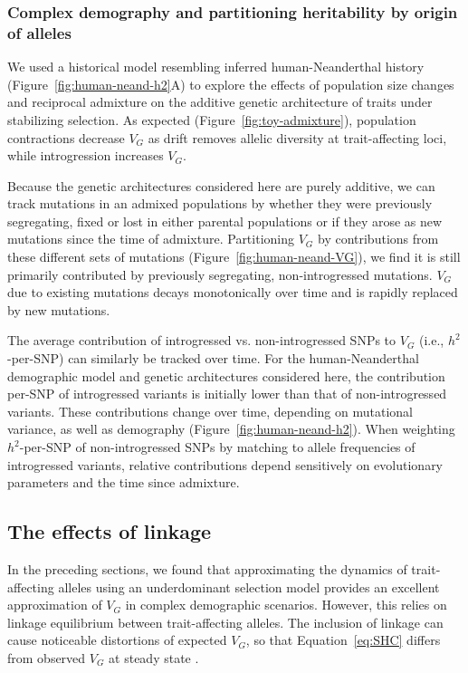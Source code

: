 \documentclass{article}
\begin{document}
\subsubsection*{Complex demography and partitioning heritability by origin of
alleles}

We used a historical model resembling inferred human-Neanderthal history
(Figure~\ref{fig:human-neand-h2}A) to explore the effects of population size
changes and reciprocal admixture on the additive genetic architecture of traits
under stabilizing selection. As expected (Figure~\ref{fig:toy-admixture}),
population contractions decrease $V_G$ as drift removes allelic diversity at
trait-affecting loci, while introgression increases $V_G$.

Because the genetic architectures considered here are purely additive, we can
track mutations in an admixed populations by whether they were previously
segregating, fixed or lost in either parental populations or if they arose as
new mutations since the time of admixture. Partitioning $V_G$ by contributions
from these different sets of mutations (Figure~\ref{fig:human-neand-VG}), we
find it is still primarily contributed by previously segregating,
non-introgressed mutations. $V_G$ due to existing mutations decays
monotonically over time and is rapidly replaced by new mutations.

The average contribution of introgressed vs. non-introgressed SNPs to $V_G$
(i.e., $h^2$-per-SNP) can similarly be tracked over time. For the
human-Neanderthal demographic model and genetic architectures considered
here, the contribution per-SNP of introgressed variants is initially lower than
that of non-introgressed variants. These contributions change over time,
depending on mutational variance, as well as demography
(Figure~\ref{fig:human-neand-h2}). When weighting $h^2$-per-SNP of
non-introgressed SNPs by matching to allele frequencies of introgressed
variants, relative contributions depend sensitively on evolutionary parameters
and the time since admixture.

\subsection*{The effects of linkage}

In the preceding sections, we found that approximating the dynamics of
trait-affecting alleles using an underdominant selection model
\citep{robertson1956effect} provides an excellent approximation of $V_G$ in
complex demographic scenarios. However, this relies on linkage equilibrium
between trait-affecting alleles. The inclusion of linkage can cause noticeable
distortions of expected $V_G$, so that Equation~\ref{eq:SHC} differs from
observed $V_G$ at steady state \citep{burger1989much, burger1994distribution,
walsh2018evolution}.
\end{document}
